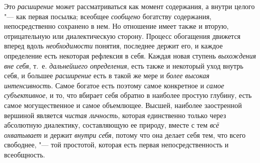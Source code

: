 Это {\em расширение} может рассматриваться как момент содержания, а внутри
целого "--- как первая посылка; всеобщее {\em сообщено} богатству
содержания, непосредственно сохранено в нем. Но отношение имеет также и
вторую, отрицательную или диалектическую сторону. Процесс обогащения
движется вперед вдоль {\em необходимости}
понятия, последнее держит его, и каждое определение есть
некоторая рефлексия в себя. Каждая новая ступень
{\em выхождения вне себя}, т.~е. {\em дальнейшего
определения}, есть также и некоторый уход внутрь себя, и
большее {\em расширение} есть в такой же мере и
{\em более высокая интенсивность}.
Самое богатое есть поэтому самое конкретное и {\em самое субъективное},
и то, что вбирает себя обратно в наиболее простую глубину,
есть самое могущественное и самое объемлющее. Высшей, наиболее заостренной
вершиной является {\em чистая
личность}, которая единственно только через абсолютную
диалектику, составляющую ее природу, вместе с тем
{\em всё охватывает} и держит {\em внутри себя},
потому что она делает себя тем, что всего свободнее, "---
той простотой, которая есть первая непосредственность и всеобщность.

